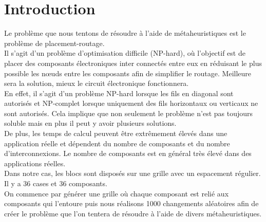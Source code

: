 \section{Introduction}

Le problème que nous tentons de résoudre à l'aide de métaheuristiques est le problème de placement-routage. \\

Il s'agit d'un problème d'optimisation difficile (NP-hard), où l'objectif est de placer des composants électroniques inter connectés entre eux en réduisant le plus possible les nœuds entre les composants afin de simplifier le routage. Meilleure sera la solution, mieux le circuit électronique fonctionnera. \\

En effet, il s'agit d'un problème NP-hard lorsque les fils en diagonal sont autorisés et NP-complet lorsque uniquement des fils horizontaux ou verticaux ne sont autorisés. Cela implique que non seulement le problème n'est pas toujours soluble mais en plus il peut y avoir plusieurs solutions. \\

De plus, les temps de calcul peuvent être extrêmement élevés dans une application réelle et dépendent du nombre de composants et du nombre d'interconnexions. Le nombre de composants est en général très élevé dans des applications réelles. \\

Dans notre cas, les blocs sont disposés sur une grille avec un espacement régulier. Il y a 36 cases et 36 composants.\\

On commence par générer une grille où chaque composant est relié aux composants qui l'entoure puis nous réalisons 1000 changements aléatoires afin de créer le problème que l'on tentera de résoudre à l'aide de divers métaheuristiques.

\newpage


